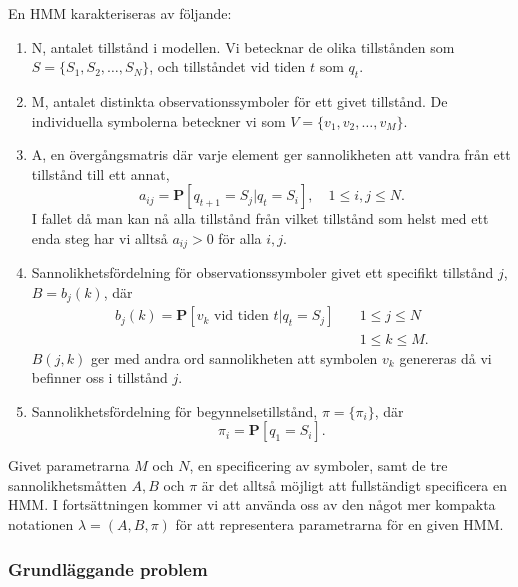 \documentclass[../rapport_MVEX01-11-05]{subfiles}
\begin{document}
En HMM karakteriseras av följande:
\begin{enumerate}
\item N, antalet tillstånd i modellen. Vi betecknar de olika
  tillstånden som $S = \{S_1, S_2, \dots, S_N\}$, och tillståndet vid
  tiden $t$ som $q_t$.
\item M, antalet distinkta observationssymboler för ett givet
  tillstånd. De individuella symbolerna beteckner vi som $V =
  \{v_1,v_2,\dots,v_M\}$.
\item A, en övergångsmatris där varje element ger sannolikheten att
  vandra från ett tillstånd till ett annat, 
\begin{equation*}
a_{ij} = \textbf{P}[q_{t+1} = S_j | q_t = S_i],\quad 1 \leq i,j \leq N.
\end{equation*}
I fallet då man kan nå alla tillstånd från vilket tillstånd som helst
med ett enda steg har vi alltså $a_{ij} > 0$ för alla $i,j$. 
\item Sannolikhetsfördelning för observationssymboler givet ett
  specifikt tillstånd $j$, $B = b_j(k)$, där 
\begin{align*}
b_j(k) = \textbf{P}[v_k \text{ vid tiden } t|q_t = S_j] \quad &1 \leq j \leq N\\
&1 \leq k \leq M.
\end{align*}
$B(j,k)$ ger med andra ord sannolikheten att symbolen $v_k$ genereras
då vi befinner oss i tillstånd $j$.
\item Sannolikhetsfördelning för begynnelsetillstånd, $\pi =
  \{\pi_i\}$, där
\begin{equation*}
\pi_i = \textbf{P}[q_1 = S_i].
\end{equation*}
\end{enumerate}
Givet parametrarna $M$ och $N$, en specificering av symboler, samt de
tre sannolikhetsmåtten $A, B$ och $\pi$ är det alltså möjligt att
fullständigt specificera en HMM. I fortsättningen kommer vi att
använda oss av den något mer kompakta notationen $\lambda = (A,B,\pi)$
för att representera parametrarna för en given HMM.

\subsubsection{Grundläggande problem}
\end{document}
